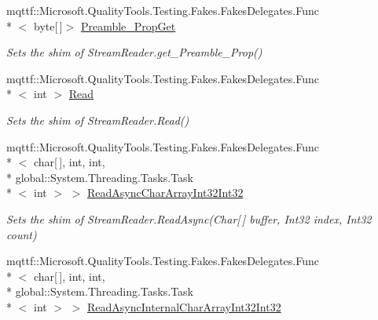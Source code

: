 \begin{DoxyCompactItemize}
mqttf\-::\-Microsoft.\-Quality\-Tools.\-Testing.\-Fakes.\-Fakes\-Delegates.\-Func\\*
$<$ byte\mbox{[}$\,$\mbox{]}$>$ \hyperlink{class_system_1_1_i_o_1_1_fakes_1_1_shim_stream_reader_a43bc1b0d79f4b39ecee42d94a5c380ee}{Preamble\-\_\-\-Prop\-Get}
\begin{DoxyCompactList}\small\item\em Sets the shim of Stream\-Reader.\-get\-\_\-\-Preamble\-\_\-\-Prop()\end{DoxyCompactList}\item 
mqttf\-::\-Microsoft.\-Quality\-Tools.\-Testing.\-Fakes.\-Fakes\-Delegates.\-Func\\*
$<$ int $>$ \hyperlink{class_system_1_1_i_o_1_1_fakes_1_1_shim_stream_reader_ae8f14567a420c442ed0d2f62ed6c12e2}{Read}
\begin{DoxyCompactList}\small\item\em Sets the shim of Stream\-Reader.\-Read()\end{DoxyCompactList}\item 
mqttf\-::\-Microsoft.\-Quality\-Tools.\-Testing.\-Fakes.\-Fakes\-Delegates.\-Func\\*
$<$ char\mbox{[}$\,$\mbox{]}, int, int, \\*
global\-::\-System.\-Threading.\-Tasks.\-Task\\*
$<$ int $>$ $>$ \hyperlink{class_system_1_1_i_o_1_1_fakes_1_1_shim_stream_reader_ad34715a681c4e42345499cce056e4058}{Read\-Async\-Char\-Array\-Int32\-Int32}
\begin{DoxyCompactList}\small\item\em Sets the shim of Stream\-Reader.\-Read\-Async(\-Char\mbox{[}$\,$\mbox{]} buffer, Int32 index, Int32 count)\end{DoxyCompactList}\item 
mqttf\-::\-Microsoft.\-Quality\-Tools.\-Testing.\-Fakes.\-Fakes\-Delegates.\-Func\\*
$<$ char\mbox{[}$\,$\mbox{]}, int, int, \\*
global\-::\-System.\-Threading.\-Tasks.\-Task\\*
$<$ int $>$ $>$ \hyperlink{class_system_1_1_i_o_1_1_fakes_1_1_shim_stream_reader_a0f808be758da4c45baf5657265568ae4}{Read\-Async\-Internal\-Char\-Array\-Int32\-Int32}

\end{DoxyCompactItemize}
